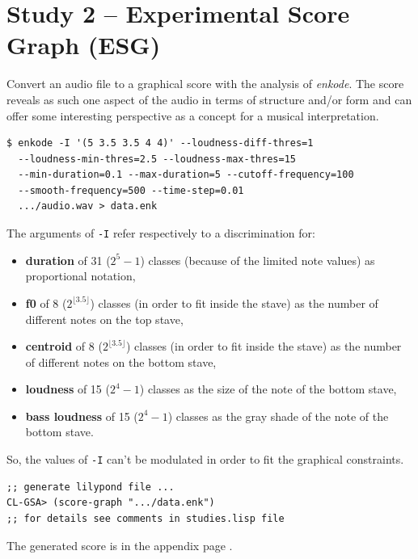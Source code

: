 \bigskip

\section*{Study 2 -- Experimental Score Graph (ESG)}


Convert an audio file to a graphical score with the analysis of \textsl{enkode}. The score reveals as such one aspect of the audio in terms of structure and/or form and can offer some interesting perspective as a concept for a musical interpretation.

\bigskip

\begin{lstlisting}
$ enkode -I '(5 3.5 3.5 4 4)' --loudness-diff-thres=1 
  --loudness-min-thres=2.5 --loudness-max-thres=15 
  --min-duration=0.1 --max-duration=5 --cutoff-frequency=100 
  --smooth-frequency=500 --time-step=0.01 
  .../audio.wav > data.enk
\end{lstlisting}

The arguments of \texttt{-I} refer respectively to a discrimination for:

\begin{itemize}
\item \textbf{duration} of 31 ($2^5 -1$) classes (because of the limited note values) as proportional notation, 
\item \textbf{f0} of 8 ($2^{\lfloor 3.5 \rfloor}$) classes (in order to fit inside the stave) as the number of different notes on the top stave,
\item \textbf{centroid} of 8 ($2^{\lfloor 3.5 \rfloor}$) classes (in order to fit inside the stave) as the number of different notes on the bottom stave,
\item \textbf{loudness} of 15 ($2^4 -1$) classes as the size of the note of the bottom stave,
\item \textbf{bass loudness} of 15 ($2^4 -1$) classes as the gray shade of the note of the bottom stave.
\end{itemize}
 
 \noindent
\begin{info}
\begin{minipage}{0.95\textwidth}
\vspace{0.2cm}
 So, the values of \texttt{-I} can't be modulated in order to fit the graphical constraints.
\vspace{0.2cm}
\end{minipage}
\end{info}

\begin{lstlisting}
;; generate lilypond file ...
CL-GSA> (score-graph ".../data.enk")
;; for details see comments in studies.lisp file
\end{lstlisting}

\noindent The generated score is in the appendix page \pageref{esg}.


